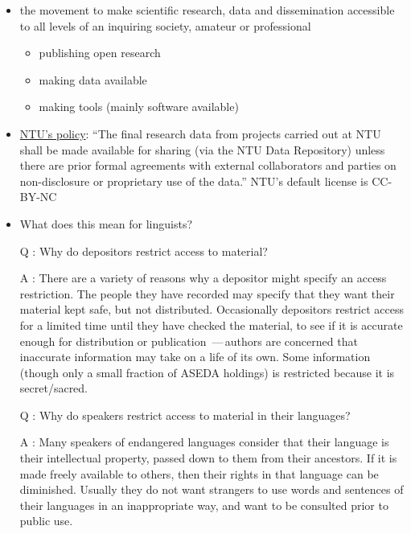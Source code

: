 \documentclass[a4paper,landscape,headrule,footrule,xetex]{foils}
\begin{document}
\begin{itemize}
\item the movement to make scientific research, data and dissemination accessible to all levels of an inquiring society, amateur or professional
  \begin{itemize}
  \item publishing open research
  \item making data available
  \item making tools (mainly software available)
  \end{itemize}
\item \href{http://research.ntu.edu.sg/rieo/RI/Pages/Research-Data-Policies.aspx}{NTU's policy}: ``The final research data from projects carried out
  at NTU shall be made available for sharing (via the NTU Data
  Repository) unless there are prior formal agreements with external
  collaborators and parties on non-disclosure or proprietary use of
  the data.''  NTU's default license is CC-BY-NC 
\item What does this mean for linguists?
\end{itemize}

\begin{itemize}
\item [Q]: Why do depositors restrict access to material?
\item [A]: There are a variety of reasons why a depositor might
  specify an access restriction.  The people they have recorded may
  specify that they want their material kept safe, but not
  distributed.  Occasionally depositors restrict access for a limited
  time until they have checked the material, to see if it is accurate
  enough for distribution or publication \,—\,authors are concerned that inaccurate information may take on a life of its own.  Some information (though only a small fraction of ASEDA holdings) is restricted because it is secret/sacred.
\newpage
\item [Q]: Why do speakers restrict access to material in their languages?
\item [A]: Many speakers of endangered languages consider that their language is their intellectual property, passed down to them from their ancestors.  If it is made freely available to others, then their rights in that language can be diminished.  Usually they do not want strangers to use words and sentences of their languages in an inappropriate way, and want to be consulted prior to public use. 
\end{itemize}
\end{document}
